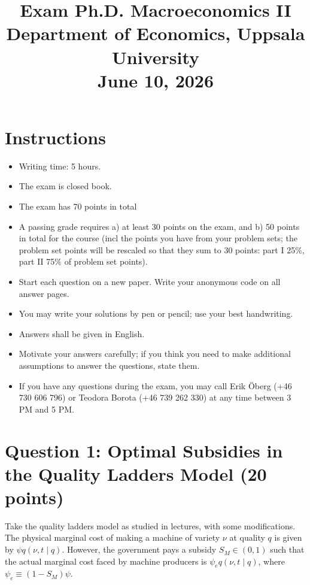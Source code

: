 \documentclass[11pt]{article}
\title{Exam Ph.D. Macroeconomics II \\
Department of Economics, Uppsala University\\
June 10, 2026}
\author{}
\date{}
\newcommand{\bit}{\begin{itemize}}
\newcommand{\eit}{\end{itemize}}
\begin{document}
\maketitle

\section*{Instructions}
\bit
	\item Writing time: 5 hours.
	
	\item The exam is closed book. 
	
	\item The exam has 70 points in total 
	
	\item A passing grade requires a) at least 30 points on  the exam, and b) 50 points in total for the course (incl the points you have from your problem sets; the problem set points will be rescaled so that they sum to 30 points: part I 25\%, part II 75\% of problem set points).
	
	\item Start each question on a new paper. Write your anonymous code on all answer pages.
	
	\item You may write your solutions by pen or pencil; use your best handwriting.
	
	\item Answers shall be given in English.

	\item Motivate your answers carefully; if you think you need to make additional assumptions to answer the questions, state them.
	
	\item If you have any questions during the exam, you may call Erik Öberg (+46 730 606 796) or Teodora Borota (+46 739 262 330) at any time between 3 PM and 5 PM.
\eit

\newpage

\section{Question 1: Optimal Subsidies in the Quality Ladders Model (20 points)}

Take the quality ladders model as studied in lectures, with some modifications. The physical marginal cost of making a machine of variety $\nu$ at quality $q$ is given by $\psi q(\nu,t \mid q)$. However, the government pays a subsidy $S_M \in (0,1)$ such that the actual marginal cost faced by machine producers is $\psi_e q(\nu,t \mid q)$, where $\psi_e \equiv (1-S_M)\psi.$
\end{document}
